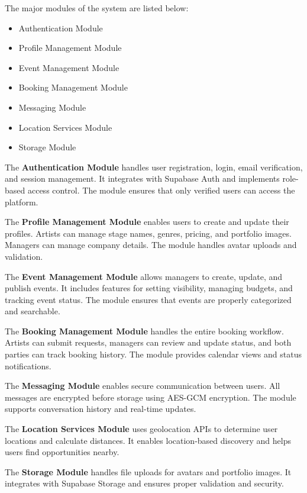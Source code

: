 \documentclass[12pt,a4paper]{report}
\begin{document}
The major modules of the system are listed below:

\begin{itemize}
    \item Authentication Module
    \item Profile Management Module
    \item Event Management Module
    \item Booking Management Module
    \item Messaging Module
    \item Location Services Module
    \item Storage Module
\end{itemize}

The \textbf{Authentication Module} handles user registration, login, email verification, and session management. It integrates with Supabase Auth and implements role-based access control. The module ensures that only verified users can access the platform.

The \textbf{Profile Management Module} enables users to create and update their profiles. Artists can manage stage names, genres, pricing, and portfolio images. Managers can manage company details. The module handles avatar uploads and validation.

The \textbf{Event Management Module} allows managers to create, update, and publish events. It includes features for setting visibility, managing budgets, and tracking event status. The module ensures that events are properly categorized and searchable.

The \textbf{Booking Management Module} handles the entire booking workflow. Artists can submit requests, managers can review and update status, and both parties can track booking history. The module provides calendar views and status notifications.

The \textbf{Messaging Module} enables secure communication between users. All messages are encrypted before storage using AES-GCM encryption. The module supports conversation history and real-time updates.

The \textbf{Location Services Module} uses geolocation APIs to determine user locations and calculate distances. It enables location-based discovery and helps users find opportunities nearby.

The \textbf{Storage Module} handles file uploads for avatars and portfolio images. It integrates with Supabase Storage and ensures proper validation and security.
\end{document}
